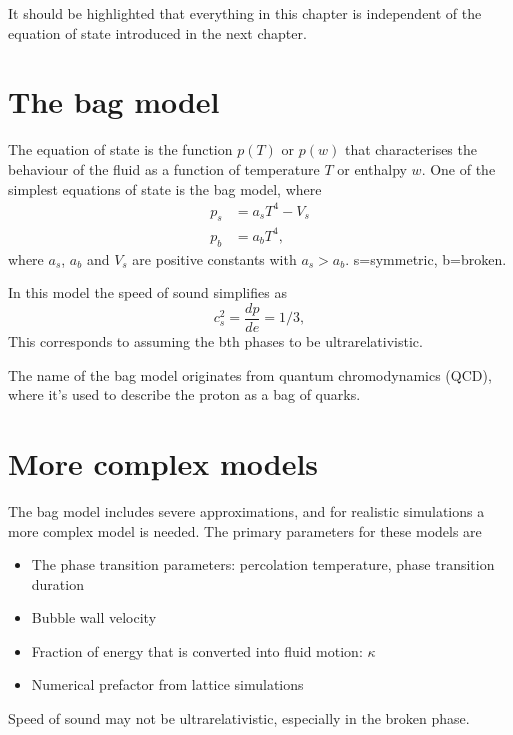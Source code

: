 It should be highlighted that everything in this chapter is independent of the equation of state introduced in the next chapter.



\section{The bag model}
The equation of state is the function $p(T)$ or $p(w)$ that characterises the behaviour of the fluid as a function of temperature $T$ or enthalpy $w$.
One of the simplest equations of state is the bag model, where
\cites[eq. 7.33]{lecture_notes}[eq. 8-9]{giese_2020}
\begin{align}
p_s &= a_s T^4 - V_s
\label{eq:bag_ps} \\
p_b &= a_b T^4,
\label{eq:bag_pb}
\end{align}
where $a_s$, $a_b$ and $V_s$ are positive constants with $a_s > a_b$.
s=symmetric, b=broken.

In this model the speed of sound simplifies as
\begin{equation}
c_s^2 = \frac{dp}{de} = 1/3,
\end{equation}
This corresponds to assuming the bth phases to be ultrarelativistic.

The name of the bag model originates from quantum chromodynamics (QCD), where it's used to describe the proton as a bag of quarks.


\section{More complex models}
The bag model includes severe approximations, and for realistic simulations a more complex model is needed.
The primary parameters for these models are
\begin{itemize}
    \item The phase transition parameters: percolation temperature, phase transition duration
    \item Bubble wall velocity
    \item Fraction of energy that is converted into fluid motion: $\kappa$
    \item Numerical prefactor from lattice simulations
\end{itemize}

Speed of sound may not be ultrarelativistic, especially in the broken phase.

